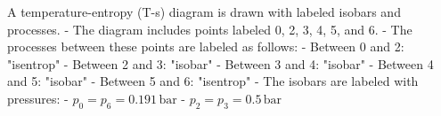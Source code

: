 A temperature-entropy (T-s) diagram is drawn with labeled isobars and processes.  
- The diagram includes points labeled 0, 2, 3, 4, 5, and 6.  
- The processes between these points are labeled as follows:  
  - Between 0 and 2: "isentrop"  
  - Between 2 and 3: "isobar"  
  - Between 3 and 4: "isobar"  
  - Between 4 and 5: "isobar"  
  - Between 5 and 6: "isentrop"  
- The isobars are labeled with pressures:  
  - \( p_0 = p_6 = 0.191 \, \text{bar} \)  
  - \( p_2 = p_3 = 0.5 \, \text{bar} \)